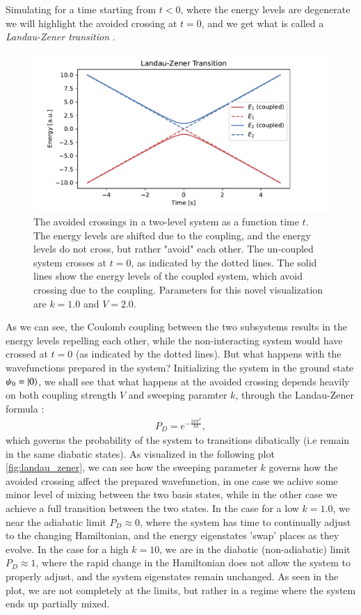 \documentclass{subfiles}
\begin{document}
Simulating for a time starting from $t<0$, where the energy levels are degenerate we will highlight the avoided crossing at $t=0$, and we get what is called a \emph{Landau-Zener transition} \cite{landau1932theorie, zener1932non}. 
\begin{figure}[h!]
    \centering
    \includegraphics[width=1.0\textwidth]{figs/avoided_crossing.pdf}
    \caption{The avoided crossings in a two-level system as a function time $t$. The energy levels are shifted due to the coupling, and the energy levels do not cross, but rather "avoid" each other. The un-coupled system crosses at $t=0$, as indicated by the dotted lines. The solid lines show the energy levels of the coupled system, which avoid crossing due to the coupling. Parameters for this novel visualization are $k=1.0$ and $V=2.0$.}
    \label{fig:avoided_crossings}
\end{figure}
As we can see, the Coulomb coupling between the two subsystems results in the energy levels repelling each other, while the non-interacting system would have crossed at $t=0$ (as indicated by the dotted lines). But what happens with the wavefunctions prepared in the system? Initializing the system in the ground state $\psi_0 = \ket{0}$, we shall see that what happens at the avoided crossing depends heavily on both coupling strength $V$ and sweeping paramter $k$, through the Landau-Zener formula \cite{landau1932theorie, zener1932non}:
\begin{align}
    P_D = e^{-\frac{2\pi V^2}{\hbar k}}\label{eq:landau_zener_trans_prob},
\end{align}
which governs the probability of the system to transitions dibatically (i.e remain in the same diabatic states). As visualized in the following plot \eqref{fig:landau_zener}, we can see how the sweeping parameter $k$ governs how the avoided crossing affect the prepared wavefunction, in one case we achive some minor level of mixing between the two basis states, while in the other case we achieve a full transition between the two states. In the case for a low $k=1.0$, we near the adiabatic limit $P_D \approx 0$, where the system has time to continually adjust to the changing Hamiltonian, and the energy eigenstates 'swap' places as they evolve. In the case for a high $k=10$, we are in the diabatic (non-adiabatic) limit $P_D \approx 1$, where the rapid change in the Hamiltonian does not allow the system to properly adjust, and the system eigenstates remain unchanged. As seen in the plot, we are not completely at the limits, but rather in a regime where the system ends up partially mixed.
\end{document}
